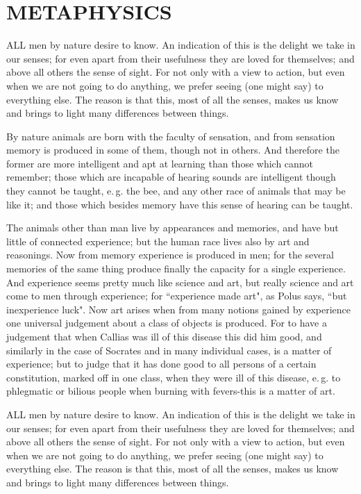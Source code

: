 \documentclass[12pt]{article}
\begin{document}
\thispagestyle{empty}



\section{METAPHYSICS}
ALL men by nature desire to know. An indication of this is the
delight we take in our senses; for even apart from their usefulness
they are loved for themselves; and above all others the sense of
sight. For not only with a view to action, but even when we are not
going to do anything, we prefer seeing (one might say) to everything
else. The reason is that this, most of all the senses, makes us know
and brings to light many differences between things.

    By nature animals are born with the faculty of sensation, and from
sensation memory is produced in some of them, though not in others.
And therefore the former are more intelligent and apt at learning than
those which cannot remember; those which are incapable of hearing
sounds are intelligent though they cannot be taught, e.\,g. the bee, and
any other race of animals that may be like it; and those which besides
memory have this sense of hearing can be taught.

    The animals other than man live by appearances and memories, and
have but little of connected experience; but the human race lives also
by art and reasonings. Now from memory experience is produced in
men; for the several memories of the same thing produce finally the
capacity for a single experience. And experience seems pretty much
like science and art, but really science and art come to men through
experience; for ``experience made art", as Polus says, ``but
inexperience luck". Now art arises when from many notions gained by
experience one universal judgement about a class of objects is
produced. For to have a judgement that when Callias was ill of this
disease this did him good, and similarly in the case of Socrates and
in many individual cases, is a matter of experience; but to judge that
it has done good to all persons of a certain constitution, marked
off in one class, when they were ill of this disease, e.\,g. to
phlegmatic or bilious people when burning with fevers-this is a matter
of art.

 ALL men by nature desire to know. An indication of this is the
delight we take in our senses; for even apart from their usefulness
they are loved for themselves; and above all others the sense of
sight. For not only with a view to action, but even when we are not
going to do anything, we prefer seeing (one might say) to everything
else. The reason is that this, most of all the senses, makes us know
and brings to light many differences between things.
\end{document}
